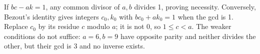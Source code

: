 If $bc-ak=1$, any common divisor of $a,b$ divides 1, proving necessity. Conversely, Bezout's identity gives integers $c_0,k_0$ with $bc_0+ak_0=1$ when the gcd is 1. Replace $c_0$ by its residue $c$ modulo $a$; it is not 0, so $1\le c<a$. The weaker conditions do not suffice: $a=6,b=9$ have opposite parity and neither divides the other, but their gcd is 3 and no inverse exists.
